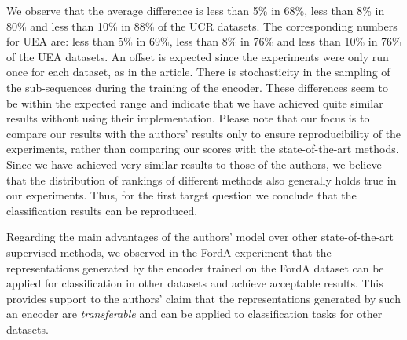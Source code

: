 We observe that the average difference is less than 5\% in 68\%, less than 8\% in 80\% and less than 10\% in 88\% of the UCR datasets. The corresponding numbers for UEA are: less than 5\% in 69\%, less than 8\% in 76\% and less than 10\% in 76\% of the UEA datasets. An offset is expected since the experiments were only run once for each dataset, as in the article. There is stochasticity in the sampling of the sub-sequences during the training of the encoder.
These differences seem to be within the expected range and indicate that we have achieved quite similar results without using their implementation. Please note that our focus is to compare our results with the authors' results only to ensure reproducibility of the experiments, rather than comparing our scores with the state-of-the-art methods. Since we have achieved very similar results to those of the authors, we believe that the distribution of rankings of different methods also generally holds true in our experiments. Thus, for the first target question we conclude that the classification results can be reproduced.

Regarding the main advantages of the authors' model over other state-of-the-art supervised methods, we observed in the FordA experiment that the representations generated by the encoder trained on the FordA dataset can be applied for classification in other datasets and achieve acceptable results. This provides support to the authors' claim that the representations generated by such an encoder are %
\textit{transferable} and can be applied to classification tasks for other datasets.

